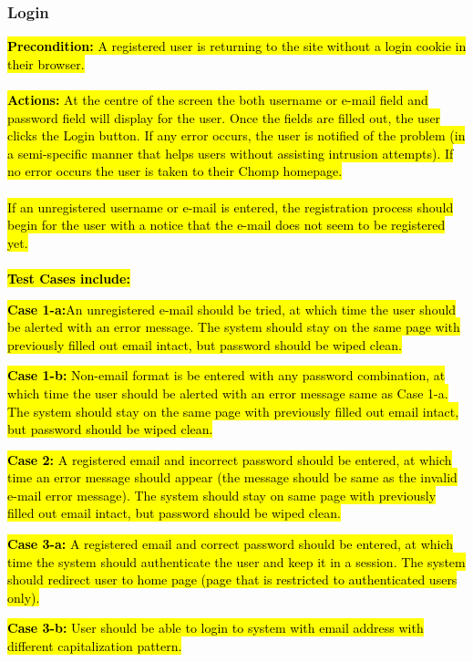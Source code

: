 \documentclass[a4paper,12pt]{article}
\begin{document}
\subsubsection{Login}
\hl{\textbf{Precondition:} A registered user is returning to the site without a login cookie in their browser.}\\
\\
\hl{\textbf{Actions:} At the centre of the screen the both username or e-mail field and password field will display for the user.  Once the fields are filled out, the user clicks the Login button.  If any error occurs, the user is notified of the problem (in a semi-specific manner that helps users without assisting intrusion attempts).  If no error occurs the user is taken to their Chomp homepage.\\
\\
If an unregistered username or e-mail is entered, the registration process should begin for the user with a notice that the e-mail does not seem to be registered yet.}\\
\\
\hl{\textbf{Test Cases include:}}
\begin{list}{•}{•}

\item \hl{\textbf{Case 1-a:}An unregistered e-mail should be tried, at which time the user should be alerted with an error message. The system should stay on the same page with previously filled out email intact, but password should be wiped clean.}

\item \hl{\textbf{Case 1-b: }Non-email format is be entered with any password combination, at which time the user should be alerted with an error message same as Case 1-a. The system should stay on the same page with previously filled out email intact, but password should be wiped clean.}

\item \hl{\textbf{Case 2: }A registered email and incorrect password should be entered, at which time an error message should appear (the message should be same as the invalid e-mail error message). The system should stay on same page with previously filled out email intact, but password should be wiped clean.}

\item \hl{\textbf{Case 3-a: }A registered email and correct password should be entered, at which time the system should authenticate the user and keep it in a session. The system should redirect user to home page (page that is restricted to authenticated users only).}

\item \hl{\textbf{Case 3-b: }User should be able to login to system with email address with different capitalization pattern.}
\end{list}
\end{document}
